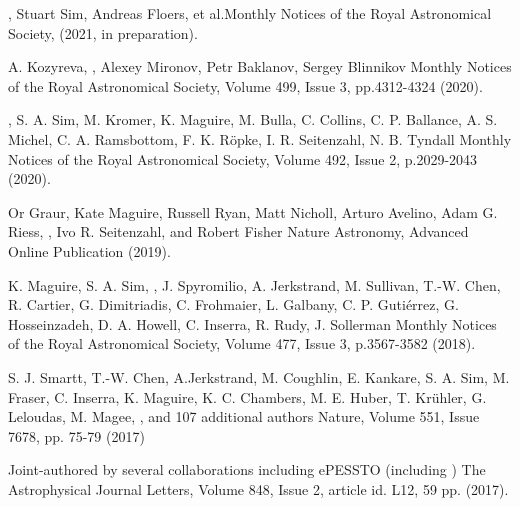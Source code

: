 {, Stuart Sim, Andreas Floers, et al.}{Monthly Notices of the Royal Astronomical Society, (2021, in preparation).}

{A. Kozyreva, , Alexey Mironov, Petr Baklanov, Sergey Blinnikov}
{Monthly Notices of the Royal Astronomical Society, Volume 499, Issue 3, pp.4312-4324 (2020).}

{, S. A. Sim, M. Kromer, K. Maguire, M. Bulla, C. Collins, C. P. Ballance, A. S. Michel, C. A. Ramsbottom, F. K. R\"opke, I. R. Seitenzahl, N. B. Tyndall}
{Monthly Notices of the Royal Astronomical Society, Volume 492, Issue 2, p.2029-2043 (2020).}

{Or Graur, Kate Maguire, Russell Ryan, Matt Nicholl, Arturo Avelino, Adam G. Riess, , Ivo R. Seitenzahl, and Robert Fisher}
{Nature Astronomy, Advanced Online Publication (2019).}

{K. Maguire, S. A. Sim, , J. Spyromilio, A. Jerkstrand, M. Sullivan, T.-W. Chen, R. Cartier, G. Dimitriadis, C. Frohmaier, L. Galbany, C. P. Gutiérrez, G. Hosseinzadeh, D. A. Howell, C. Inserra, R. Rudy, J. Sollerman}
{Monthly Notices of the Royal Astronomical Society, Volume 477, Issue 3, p.3567-3582 (2018).}

{S. J. Smartt, T.-W. Chen, A.Jerkstrand, M. Coughlin, E. Kankare, S. A. Sim, M. Fraser, C. Inserra, K. Maguire, K. C. Chambers,
M. E. Huber, T. Kr\"uhler, G. Leloudas, M. Magee, , and 107 additional authors}
{Nature, Volume 551, Issue 7678, pp. 75-79 (2017)}

{Joint-authored by several collaborations including ePESSTO (including )}
{The Astrophysical Journal Letters, Volume 848, Issue 2, article id. L12, 59 pp. (2017).}

